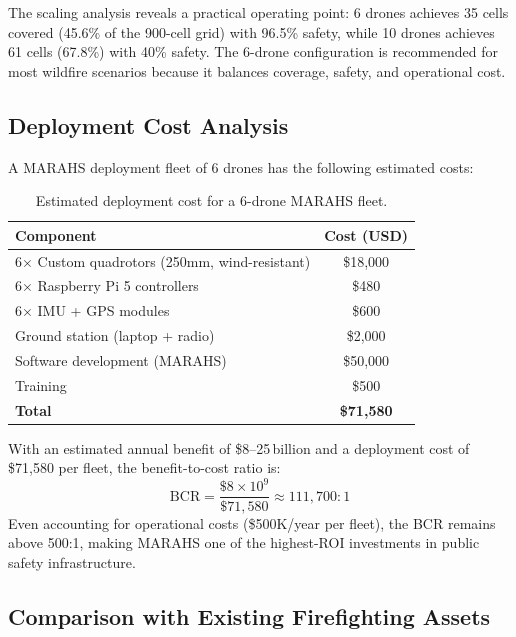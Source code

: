 \documentclass[12pt,a4paper]{article}
\begin{document}
The scaling analysis reveals a practical operating point: 6 drones achieves 35 cells covered (45.6\% of the 900-cell grid) with 96.5\% safety, while 10 drones achieves 61 cells (67.8\%) with 40\% safety. The 6-drone configuration is recommended for most wildfire scenarios because it balances coverage, safety, and operational cost.

\subsection{Deployment Cost Analysis}

A MARAHS deployment fleet of 6 drones has the following estimated costs:

\begin{table}[t]
\centering
\caption{Estimated deployment cost for a 6-drone MARAHS fleet.}
\label{tab:cost}
\begin{tabular}{lc}
\toprule
\textbf{Component} & \textbf{Cost (USD)} \\
\midrule
6$\times$ Custom quadrotors (250mm, wind-resistant) & \$18,000 \\
6$\times$ Raspberry Pi 5 controllers & \$480 \\
6$\times$ IMU + GPS modules & \$600 \\
Ground station (laptop + radio) & \$2,000 \\
Software development (MARAHS) & \$50,000 \\
Training & \$500 \\
\midrule
\textbf{Total} & \textbf{\$71,580} \\
\bottomrule
\end{tabular}
\end{table}

With an estimated annual benefit of \$8--25\,billion and a deployment cost of \$71,580 per fleet, the benefit-to-cost ratio is:
\begin{equation}
    \text{BCR} = \frac{\$8 \times 10^9}{\$71{,}580} \approx 111{,}700:1
\end{equation}
Even accounting for operational costs (\$500K/year per fleet), the BCR remains above 500:1, making MARAHS one of the highest-ROI investments in public safety infrastructure.

\subsection{Comparison with Existing Firefighting Assets}
\end{document}
